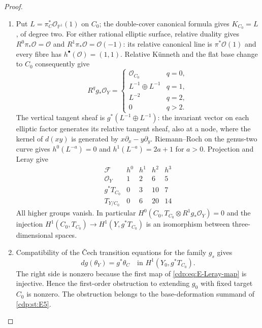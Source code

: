 \begin{proof}
\begin{enumerate}[label=\arabic*.,leftmargin=*]
\item Put
$L=\pi_C^*\mathcal O_{\mathbb P^1}(1)$ on $C_0$; the
double-cover canonical formula gives $K_{C_0}=L$, of degree two.
For either rational elliptic surface, relative duality gives
$R^0\pi_*\mathcal O=\mathcal O$ and
$R^1\pi_*\mathcal O=\mathcal O(-1)$: its relative canonical
line is $\pi^*\mathcal O(1)$ and every fibre has
$h^\bullet(\mathcal O)=(1,1)$. Relative K\"unneth and the flat
base change to $C_0$ consequently give
\[
 R^qg_*\mathcal O_Y=
 \begin{cases}
  \mathcal O_{C_0}&q=0,\\
  L^{-1}\oplus L^{-1}&q=1,\\
  L^{-2}&q=2,\\
  0&q>2.
 \end{cases}
\]
The vertical tangent sheaf is $g^*(L^{-1}\oplus L^{-1})$:
the invariant vector on each elliptic factor generates its
relative tangent sheaf, also at a node, where the kernel of
$d(xy)$ is generated by $x\partial_x-y\partial_y$.
Riemann--Roch on the genus-two curve gives
$h^0(L^{-a})=0$ and $h^1(L^{-a})=2a+1$ for $a>0$.
Projection and Leray give
\[
\begin{array}{c|rrrr}
 \mathcal F&h^0&h^1&h^2&h^3\\\hline
 \mathcal O_Y&1&2&6&5\\
 g^*T_{C_0}&0&3&10&7\\
 T_{Y/C_0}&0&6&20&14
\end{array}
\]
All higher groups vanish. In particular
$H^0(C_0,T_{C_0}\otimes R^1g_*\mathcal O_Y)=0$ and the
injection $H^1(C_0,T_{C_0})\to H^1(Y,g^*T_{C_0})$ is an
isomorphism between three-dimensional spaces.

\item Compatibility of the \v{C}ech transition equations for the family
$g_s$ gives
\[
 dg(\theta_Y)=g^*\theta_C
       \quad\text{in }H^1(Y_0,g^*T_{C_0}).
\]
The right side is nonzero because the first map of
\eqref{cdp:eq:E-Leray-map} is injective. Hence the first-order
obstruction to extending $g_0$ with fixed target $C_0$ is nonzero.
The obstruction belongs to
the base-deformation summand of \ref{cdp:st:E5}.

\end{enumerate}
\end{proof}